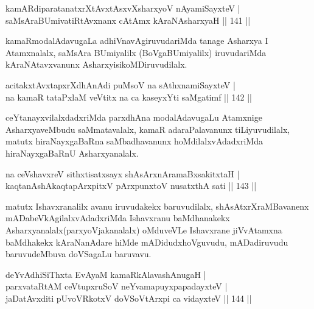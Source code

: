 \begin{shl}
kamARdiparatanatxrXtAvxtAsxvXsharxyoV nAyamiSayxteV |\\
saMsAraBUmivatiRtAvxnanx cA\s \s tAmx kAraNAsharxyaH \hfill || 141 ||
\end{shl}

\begin{artha}
kamaRmodalAdavugaLa adhiVnavAgiruvudariMda tanage Asharxya I Atamxnalalx, saMsAra 
BUmiyalilx (BoVgaBUmiyalilx) iruvudariMda kAraNAtavxvanunx AsharxyisikoMDiruvudilalx.
\end{artha}


\begin{shl}
acitakxtAvxtapxrXdhAnAdi puMsoV na sAthxnamiSayxteV |\\
na kamaR tataPxlaM veVtitx na ca kaseyxYti saMgatimf \hfill || 142 ||
\end{shl}

\begin{artha}
ceYtanayxvilalxdadxriMda parxdhAna modalAdavugaLu Atamxnige AsharxyaveMbudu saMmatavalalx, kamaR adaraPalavanunx tiLiyuvudilalx, matutx hiraNayxgaBaRna saMbadhavanunx hoMdilalxvAdadxriMda hiraNayxgaBaRnU Asharxyanalalx.
\end{artha}


\begin{shl}
na ceVshavxreV sithxtisatxsayx shAsArxnAramaBxsakitxtaH |\\
kaqtanAshAkaqtapArxpitxV pArxpunxtoV nusatxthA sati \hfill || 143 ||
\end{shl}

\begin{artha}
matutx Ishavxranalilx avanu iruvudakekx baruvudilalx, shAsAtxrXraMBavanenx mADabeVkAgilalxvAdadxriMda Ishavxranu baMdhanakekx Asharxyanalalx(parxyoVjakanalalx) oMduveVLe Ishavxrane jiVvAtamxna baMdhakekx kAraNanAdare hiMde mADidudxhoVguvudu, mADadiruvudu baruvudeMbuva doVSagaLu baruvavu.
\end{artha}


\begin{shl}
deYvAdhiSiThxta EvAyaM kamaRkAlavashAnugaH |\\
parxvataRtAM ceVtupxruSoV neYvamapuyxpapadayxteV |\\
jaDatAvxditi pUvoVRkotxV doVSoV\s tArxpi ca vidayxteV \hfill || 144 ||
\end{shl}

